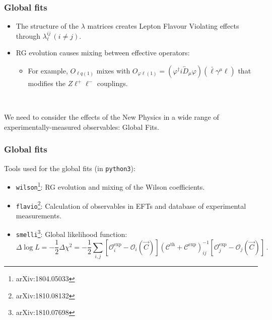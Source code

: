 \documentclass[mathserif, 10pt]{beamer}
\begin{document}
\begin{frame}
    \frametitle{Global fits}
    \begin{itemize}
        \item The structure of the $\lambda$ matrices creates Lepton Flavour Violating effects through $\lambda_\ell^{ij}\, (i\neq j)$.
        \item RG evolution causes mixing between effective operators:
              \begin{itemize}
                  \item For example, $O_{\ell q(1)}$ mixes with $O_{\varphi \ell(1)} = (\varphi^\dagger i \overleftrightarrow D_{\mu} \varphi)(\bar{\ell} \gamma^\mu \ell )$ that modifies the $Z\ell^+\ell^-$ couplings.
              \end{itemize}
    \end{itemize}

    ~

    We need to consider the effects of the New Physics in a wide range of experimentally-measured observables: Global Fits.


\end{frame}

\begin{frame}
    \frametitle{Global fits}

    Tools used for the global fits (in \texttt{python3}):
    \begin{itemize}
        \item \texttt{wilson}\footnote[1]{arXiv:1804.05033}: RG evolution and mixing of the Wilson coefficients.
        \item \texttt{flavio}\footnote[2]{arXiv:1810.08132}: Calculation of observables in EFTs and database of experimental measurements.
        \item \texttt{smelli}\footnote[3]{arXiv:1810.07698}: Global likelihood function:
              {\small$$\Delta \log L = -\frac{1}{2}\Delta\chi^2 = -\frac{1}{2}\sum_{i,j} [\mathcal{O}_i^\mathrm{exp} - \mathcal{O}_i(\vec{C})] (\mathcal{C}^\mathrm{th}+\mathcal{C}^\mathrm{exp})^{-1}_{ij} [\mathcal{O}_j^\mathrm{exp} - \mathcal{O}_j(\vec{C})]\,. $$}
    \end{itemize}

\end{frame}
\end{document}
